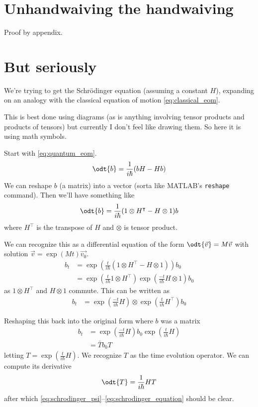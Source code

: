 \documentclass[12pt, oneside, letterpaper, fleqn]{article}
\begin{document}
\begin{appendices}
\section{Unhandwaiving the handwaiving}\label{app:complicated}
Proof by appendix.

\section{But seriously}
We're trying to get the Schr\"odinger equation (assuming a constant
$H$), expanding on an analogy with the classical equation of motion
\eqref{eq:classical_eom}.

This is best done using diagrams (as is anything involving tensor
products and products of tensors) but currently I don't feel like
drawing them. So here it is using math symbols.

Start with \eqref{eq:quantum_eom}.
\begin{align*}
\odt{b} = \frac{1}{i\hbar}(bH - Hb)
\end{align*}
We can reshape $b$ (a matrix) into a vector (sorta like MATLAB's
\texttt{reshape} command). Then we'll have something like
\begin{align*}
\odt{b} = \frac{1}{i\hbar}(1\otimes H^\intercal - H\otimes 1)b
\end{align*}
where $H^\intercal$ is the transpose of $H$ and $\otimes$ is tensor product.

We can recognize this as a differential equation of the form
$\odt{\vec{v}} = M\vec{v}$ with solution $\vec{v} = \exp(Mt)\vec{v_0}$.
\begin{align*}
b_t &= \exp\left(\frac{t}{i\hbar}(1\otimes H^\intercal - H\otimes 1)\right)b_0\\
&= \exp\left(\frac{t}{i\hbar}1\otimes H^\intercal\right)
\exp\left(\frac{-t}{i\hbar}H\otimes 1\right)b_0
\end{align*}
as $1\otimes H^\intercal$ and $H\otimes 1$ commute. This can be written as
\begin{align*}
b_t &= \exp\left(\frac{-t}{i\hbar}H\right)
\otimes\exp\left(\frac{t}{i\hbar}H^\intercal\right)b_0
\end{align*}

Reshaping this back into the original form where $b$ was a matrix
\begin{align*}
b_t &= \exp\left(\frac{-t}{i\hbar}H\right) b_0
\exp\left(\frac{t}{i\hbar}H\right)\\
&= \bar{T} b_0 T
\end{align*}
letting $T = \exp\left(\frac{t}{i\hbar}H\right)$. We recognize $T$ as
the time evolution operator. We can compute its derivative
\begin{align*}
\odt{T} = \frac{1}{i\hbar} HT
\end{align*}
after which \eqref{eq:schrodinger_psi}--\eqref{eq:schrodinger_equation}
should be clear.
\end{appendices}
\end{document}
